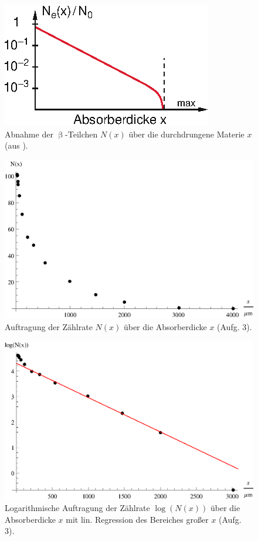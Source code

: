 \begin{figure}[tb]
	\centering
	\includegraphics[scale=1.5]{fig/iii_3_dem.eps}
	\caption{Abnahme der $\upbeta$-Teilchen $N(x)$ über die durchdrungene Materie $x$ (aus \cite[S. 92]{Dem10}).}
	\label{fig:iii_3_dem}
\end{figure}

\begin{figure}[tb]
	\centering
	\includegraphics[scale=1.0]{fig/iii_3_plota.eps}
	\caption{Auftragung der Zählrate $N(x)$ über die Absorberdicke $x$ (Aufg. 3).}
	\label{fig:iii_3_plota}
\end{figure}

\begin{figure}[tb]
	\centering
	\includegraphics[scale=1.0]{fig/iii_3_plotb.eps}
	\caption{Logarithmische Auftragung der Zählrate $\log(N(x))$ über die Absorberdicke $x$ mit lin. Regression des Bereiches großer $x$ (Aufg. 3).}
	\label{fig:iii_3_plotb}
\end{figure}

